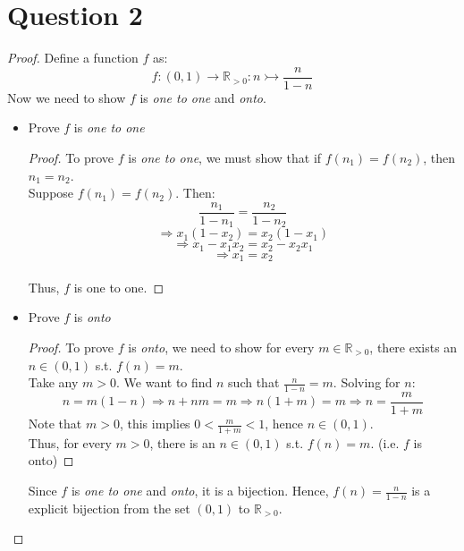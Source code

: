 \documentclass{article}
\begin{document}
\section*{Question 2}
\begin{proof}
    Define a function $f$ as:
    \[ f: (0,1) \rightarrow \mathbb{R}_{>0}: n \rightarrowtail \frac{n}{1-n} \]
    Now we need to show $f$ is \textit{one to one} and \textit{onto}.
    \begin{itemize}
        \item Prove $f$ is \textit{one to one}
        \begin{proof}
            To prove $f$ is \textit{one to one}, we must show that if $f(n_1) = f(n_2)$, then $n_1 = n_2$.
            \\
            Suppose $f(n_1) = f(n_2)$. Then:
            \[ \frac{n_1}{1 - n_1} = \frac{n_2}{1 - n_2} \]
            \[ \Rightarrow x_1(1-x_2) = x_2(1-x_1) \]
            \[ \Rightarrow x_1 - x_1x_2 = x_2 - x_2x_1 \]
            \[ \Rightarrow x_1 = x_2 \]
            \\
            Thus, $f$ is one to one.
        \end{proof}
        \item Prove $f$ is \textit{onto}
        \begin{proof}
            To prove $f$ is \textit{onto}, we need to show for every $m \in \mathbb{R}_{>0}$, there exists an $n \in (0,1)$ s.t. $f(n) = m$.
            \\
            Take any $m > 0$. We want to find $n$ such that $\frac{n}{1 - n} = m$. Solving for $n$:
            \[ n = m(1 - n) \Rightarrow n + nm = m \Rightarrow n(1 + m) = m \Rightarrow n = \frac{m}{1 + m} \]
            Note that $m > 0$, this implies $0 < \frac{m}{1 + m} < 1$, hence $n \in (0,1)$.
            \\
            Thus, for every $m > 0$, there is an $n \in (0,1)$ s.t. $f(n) = m$. (i.e. $f$ is onto)
        \end{proof}
        Since $f$ is \textit{one to one} and \textit{onto}, it is a bijection. Hence, $f(n) = \frac{n}{1-n}$ is a explicit bijection from the set $(0,1)$ to $\mathbb{R}_{>0}$.
    \end{itemize}
\end{proof}
\end{document}
